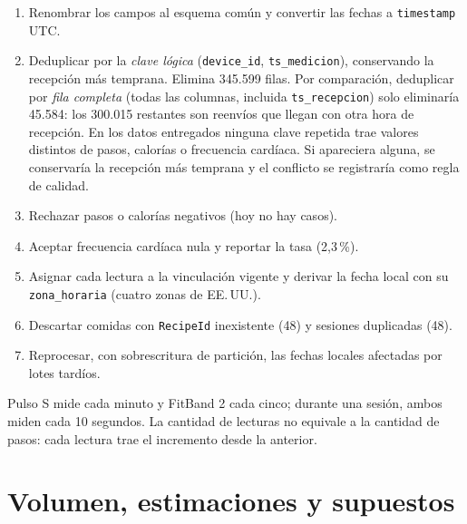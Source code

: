 \documentclass[11pt]{article}
\newcommand{\codigo}[1]{\texttt{\small #1}}
\begin{document}
\begin{enumerate}
    \item Renombrar los campos al esquema común y convertir las fechas
    a \codigo{timestamp} UTC.
    \item Deduplicar por la \emph{clave lógica}
    (\codigo{device\_id}, \codigo{ts\_medicion}), conservando la
    recepción más temprana. Elimina 345.599 filas. Por comparación,
    deduplicar por \emph{fila completa} (todas las columnas, incluida
    \codigo{ts\_recepcion}) solo eliminaría 45.584: los 300.015
    restantes son reenvíos que llegan con otra hora de recepción.
    En los datos entregados ninguna clave repetida trae valores
    distintos de pasos, calorías o frecuencia cardíaca. Si apareciera
    alguna, se conservaría la recepción más temprana y el conflicto
    se registraría como regla de calidad.
    \item Rechazar pasos o calorías negativos (hoy no hay casos).
    \item Aceptar frecuencia cardíaca nula y reportar la tasa
    (2,3\,\%).
    \item Asignar cada lectura a la vinculación vigente y derivar la
    fecha local con su \codigo{zona\_horaria} (cuatro zonas de EE.\,UU.).
    \item Descartar comidas con \codigo{RecipeId} inexistente (48) y
    sesiones duplicadas (48).
    \item Reprocesar, con sobrescritura de partición, las fechas
    locales afectadas por lotes tardíos.
\end{enumerate}

Pulso S mide cada minuto y FitBand 2 cada cinco; durante una sesión,
ambos miden cada 10 segundos. La cantidad de lecturas no equivale a
la cantidad de pasos: cada lectura trae el incremento desde la
anterior.

\section{Volumen, estimaciones y supuestos}
\end{document}
